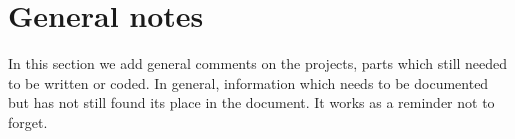 \documentclass[a4paper,12pt]{article}
\begin{document}














\section{General notes}
In this section we add general comments on the projects, parts which still needed to be written or coded. In general, information which needs to be documented but has not still found its place in the document. It works as a reminder not to forget.
\end{document}
